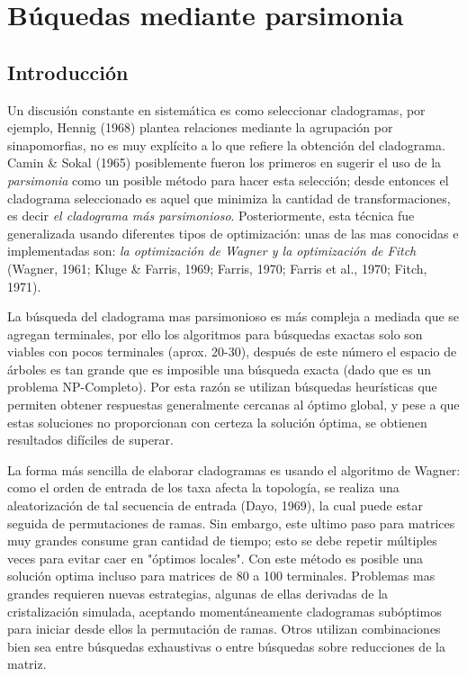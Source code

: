 
\chapter{B\'uquedas mediante parsimonia} %
\label{cha:parsimonia}

\section*{Introducci\'on} 

Un discusi\'on constante en sistem\'atica es como seleccionar cladogramas, por ejemplo, {\color{red}Hennig (1968)} plantea relaciones mediante la agrupaci\'on por sinapomorfias, no es muy expl\'icito a lo que refiere la obtenci\'on del cladograma. {\color{red}Camin \& Sokal (1965)} posiblemente fueron los primeros en sugerir el uso de la \textit{parsimonia} como un posible m\'etodo para hacer esta selecci\'on; desde entonces el cladograma seleccionado es aquel que minimiza la cantidad de transformaciones, es decir \textit{el cladograma más parsimonioso}. Posteriormente, esta t\'ecnica fue generalizada usando diferentes tipos de optimizaci\'on: unas de las mas conocidas e implementadas son: \textit{la optimizaci\'on de Wagner y la optimizaci\'on de Fitch} {\color{red}(Wagner, 1961; Kluge \& Farris, 1969; Farris, 1970; Farris et al., 1970; Fitch, 1971)}.


La b\'usqueda del cladograma mas parsimonioso es m\'as compleja a mediada que se agregan terminales,  por ello los algoritmos para b\'usquedas exactas solo son viables con pocos terminales (aprox. 20-30),  despu\'es de este n\'umero el espacio de \'arboles es tan grande que es imposible una búsqueda exacta (dado que es un problema NP-Completo). Por esta raz\'on se utilizan b\'usquedas heur\'isticas que permiten obtener respuestas generalmente cercanas al \'optimo global,  y pese a que estas soluciones no proporcionan con certeza la solución \'optima, se obtienen resultados  dif\'iciles de superar.

La forma m\'as sencilla de elaborar cladogramas es usando el algoritmo de Wagner: como el orden de entrada de los taxa afecta la topolog\'ia,  se realiza una aleatorización de tal secuencia de entrada {\color{red} (Dayo, 1969)},  la cual puede estar seguida de permutaciones de ramas. Sin embargo,  este ultimo paso para matrices muy grandes consume gran cantidad de tiempo; esto se debe repetir m\'ultiples veces para evitar caer en "\'optimos locales". Con este método es posible una solución optima incluso para matrices de 80 a 100 terminales. Problemas mas grandes requieren nuevas estrategias,  algunas de ellas derivadas de la cristalizaci\'on simulada,  aceptando moment\'aneamente cladogramas sub\'optimos para iniciar desde ellos la permutaci\'on de ramas. Otros utilizan combinaciones bien sea entre b\'usquedas exhaustivas o entre búsquedas sobre reducciones de la matriz.

